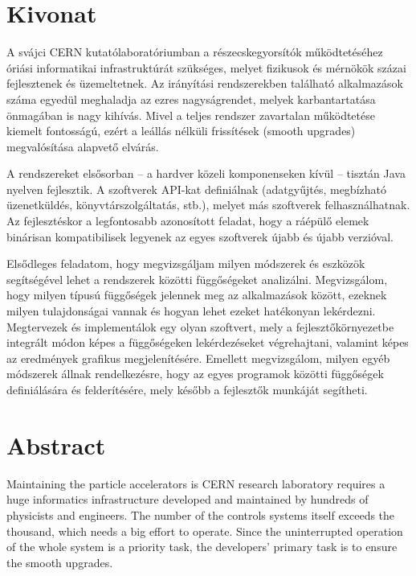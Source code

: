 \chapter*{Kivonat}

A svájci CERN kutatólaboratóriumban a részecskegyorsítók működtetéséhez óriási
informatikai infrastruktúrát szükséges, melyet fizikusok és mérnökök százai
fejlesztenek és üzemeltetnek. Az irányítási rendszerekben található
alkalmazások száma egyedül meghaladja az ezres nagyságrendet, melyek
karbantartatása önmagában is nagy kihívás. Mivel a teljes rendszer zavartalan
működtetése kiemelt fontosságú, ezért a leállás nélküli frissítések (smooth
upgrades) megvalósítása alapvető elvárás.

A rendszereket elsősorban – a hardver közeli komponenseken kívül – tisztán Java
nyelven fejlesztik. A szoftverek API-kat definiálnak (adatgyűjtés, megbízható
üzenetküldés, könyvtárszolgáltatás, stb.), melyet más szoftverek
felhasználhatnak. Az fejlesztéskor a legfontosabb azonosított feladat, hogy a
ráépülő elemek binárisan kompatibilisek legyenek az egyes szoftverek újabb és
újabb verzióval.

Elsődleges feladatom, hogy megvizsgáljam milyen módszerek és eszközök
segítségével lehet a rendszerek közötti függőségeket analizálni. Megvizsgálom,
hogy milyen típusú függőségek jelennek meg az alkalmazások között, ezeknek
milyen tulajdonságai vannak és hogyan lehet ezeket hatékonyan lekérdezni.
Megtervezek és implementálok egy olyan szoftvert, mely a fejlesztőkörnyezetbe
integrált módon képes a függőségeken lekérdezéseket végrehajtani, valamint
képes az eredmények grafikus megjelenítésére. Emellett megvizsgálom, milyen
egyéb módszerek állnak rendelkezésre, hogy az egyes programok közötti
függőségek definiálására és felderítésére, mely később a fejlesztők munkáját
segítheti.
\vfill

\chapter*{Abstract}
Maintaining the particle accelerators is CERN research laboratory requires a
huge informatics infrastructure developed and maintained by hundreds of
physicists and engineers. The number of the controls systems itself exceeds the
thousand, which needs a big effort to operate. Since the uninterrupted
operation of the whole system is a priority task, the developers' primary task
is to ensure the smooth upgrades.

